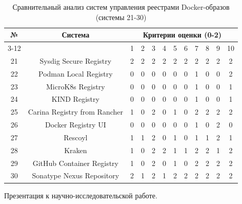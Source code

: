 \begin{table}[h!]
	\centering
	\caption{Сравнительный анализ систем управления реестрами Docker-образов (системы 21-30)}
	\label{table:comparison-3}
	\footnotesize
	\setlength{\tabcolsep}{2pt}
	\begin{tabular}{|c|c|cccccccccc|}
		\hline
		\multirow{2}{*}{№} & 
		\multirow{2}{*}{Система} & 
		\multicolumn{10}{c|}{Критерии оценки (0-2)} \\
		\cline{3-12}
		& & 1 & 2 & 3 & 4 & 5 & 6 & 7 & 8 & 9 & 10 \\
		\hline
		21 & Sysdig Secure Registry & 2 & 2 & 2 & 2 & 2 & 2 & 2 & 2 & 2 & 2 \\
		22 & Podman Local Registry & 0 & 0 & 0 & 0 & 0 & 0 & 1 & 0 & 0 & 2 \\
		23 & MicroK8s Registry & 0 & 0 & 0 & 0 & 0 & 0 & 1 & 0 & 0 & 1 \\
		24 & KIND Registry & 0 & 0 & 0 & 0 & 0 & 0 & 1 & 0 & 0 & 1 \\
		25 & Carina Registry from Rancher & 1 & 0 & 2 & 0 & 1 & 0 & 2 & 2 & 2 & 2 \\
		26 & Docker Registry UI & 0 & 0 & 0 & 0 & 0 & 0 & 1 & 0 & 2 & 0 \\
		27 & Rescoyl & 1 & 1 & 2 & 0 & 1 & 0 & 1 & 1 & 2 & 1 \\
		28 & Kraken & 1 & 0 & 2 & 2 & 1 & 1 & 2 & 2 & 1 & 2 \\
		29 & GitHub Container Registry & 1 & 0 & 2 & 0 & 1 & 0 & 2 & 2 & 2 & 2 \\
		30 & Sonatype Nexus Repository & 2 & 1 & 2 & 1 & 2 & 2 & 2 & 2 & 2 & 2 \\
		\hline
	\end{tabular}
\end{table}

\endgroup

\clearpage


Презентация к научно-исследовательской работе.
